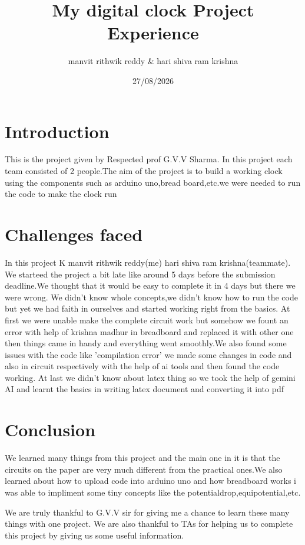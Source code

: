 \documentclass{article}
\title{My digital clock Project Experience}
\author{manvit rithwik reddy & hari shiva ram krishna}
\date{27/08/2026}
\begin{document}
               

\maketitle                     

\section{Introduction}
    This is the project given by Respected prof G.V.V Sharma.
    In this project each team consisted of 2 people.The aim 
    of the project is to build a working clock using the 
    components such as arduino uno,bread board,etc.we were needed
    to run the code to make the clock run 

 \section{Challenges faced}
    In this project K manvit rithwik reddy(me) hari shiva ram krishna(teammate).
    We starteed the project a bit late like around 5 days before
    the submission deadline.We thought that it would be easy to 
    complete it in 4 days but there we were wrong. We didn't know
    whole concepts,we didn't know how to run the code but yet we 
    had faith in ourselves and started working right from the basics.
    At first we were unable make the complete circuit work but somehow we 
    fount an error with help of krishna madhur in breadboard and replaced it with other one then 
    things came in handy and everything went smoothly.We also found some 
    issues with the code like 'compilation error' we made some changes 
    in code and also in circuit respectively with the help of ai tools and then found the code working.
    At last we didn't know about latex thing so we took the help of gemini AI 
    and learnt the basics in writing latex document and converting it into pdf

 \section{Conclusion}
    We learned many things from this project and the main one in it is that 
    the circuits on the paper are very much different from the practical
    ones.We also learned about how to upload code into arduino uno
    and how breadboard works i was able to impliment some tiny concepts
    like the potentialdrop,equipotential,etc. 
    

    We are truly thankful to G.V.V sir for giving me a chance to learn these many
    things with one project.
    We are also thankful to TAs for helping us to complete this project by giving us
    some useful information.
\end{document}
